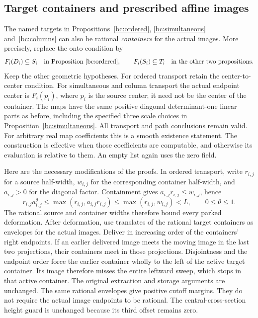 \subsection{Target containers and prescribed affine images}
\label{bc:contained-targets}
The named targets in Propositions~\ref{bc:ordered}, \ref{bc:simultaneous}
and~\ref{bc:columns} can also be rational \emph{containers} for the actual
images. More precisely, replace the onto condition by
\[
 F_i(D_i)\subseteq S_i\quad\text{in Proposition~\ref{bc:ordered}},
 \qquad
 F_i(S_i)\subseteq T_i\quad\text{in the other two propositions}.
\]
Keep the other geometric hypotheses. For ordered transport retain the
center-to-center condition. For simultaneous and column transport the
actual endpoint center is $F_i(p_i)$, where $p_i$ is the source center;
it need not be the center of the container. The maps have the same positive
diagonal determinant-one linear parts as before, including the specified
three scale choices in Proposition~\ref{bc:simultaneous}.
All transport and path conclusions remain valid. For arbitrary real map
coefficients this is a smooth existence statement. The construction is
effective when those coefficients are computable, and otherwise its
evaluation is relative to them. An empty list again uses the zero field.

Here are the necessary modifications of the proofs. In ordered transport,
write $r_{i,j}$ for a source half-width, $w_{i,j}$ for the corresponding
container half-width, and $a_{i,j}>0$ for the diagonal factor. Containment
gives $a_{i,j}r_{i,j}\le w_{i,j}$, hence
\[
 r_{i,j}a_{i,j}^{\theta}
 \le\max(r_{i,j},a_{i,j}r_{i,j})
 \le\max(r_{i,j},w_{i,j})<L,\qquad 0\le\theta\le1.
\]
The rational source and container widths therefore bound every parked
deformation. After deformation, use translates of the rational target
containers as envelopes for the actual images. Deliver in increasing
order of the containers' right endpoints. If an earlier delivered image
meets the moving image in the last two projections, their containers meet
in those projections. Disjointness and the endpoint order force the earlier
container wholly to the left of the active target container. Its image
therefore misses the entire leftward sweep, which stops in that active
container. The original extraction and storage arguments are unchanged.
The same rational envelopes give positive cutoff margins. They do not
require the actual image endpoints to be rational. The central-cross-section
height guard is unchanged because its third offset remains zero.

